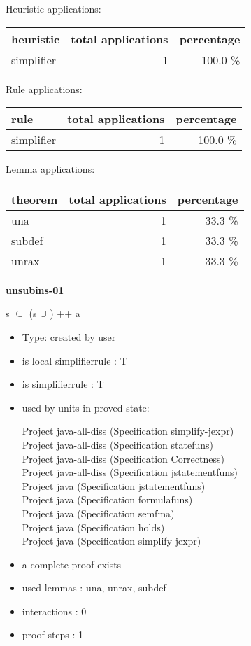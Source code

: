 \documentclass[a4paper]{article}
\begin{document}
\medskip


Heuristic applications:

\begin{supertabular}{l|r|r}
heuristic	& total applications & percentage \\ \hline
simplifier & 1 & 100.0 \% \\

\end{supertabular}

Rule applications:

\begin{supertabular}{l|r|r}
rule	        & total applications & percentage \\ \hline
simplifier & 1 & 100.0 \% \\

\end{supertabular}

Lemma applications:

\begin{supertabular}{l|r|r}
theorem	        & total applications & percentage \\ \hline
una & 1 & 33.3 \% \\
subdef & 1 & 33.3 \% \\
unrax & 1 & 33.3 \% \\

\end{supertabular}
\pagebreak

{\LARGE\bf unsubins-01}\label{lemma-unsubins-01}

\medskip

 \Fol s $\subseteq$ (s $\cup$ ) ++ a

\begin{itemize}

\item Type: created by user

\item is local simplifierrule : T
\item is simplifierrule : T
\item used by units in proved state:

Project java-all-diss (Specification simplify-jexpr) \\
Project java-all-diss (Specification statefuns) \\
Project java-all-diss (Specification Correctness) \\
Project java-all-diss (Specification jstatementfuns) \\
Project java (Specification jstatementfuns) \\
Project java (Specification formulafuns) \\
Project java (Specification semfma) \\
Project java (Specification holds) \\
Project java (Specification simplify-jexpr)
\item       a complete proof exists
\item       used lemmas  : una, unrax, subdef
\item       interactions : 0
\item       proof steps  : 1
\end{itemize}
\end{document}
